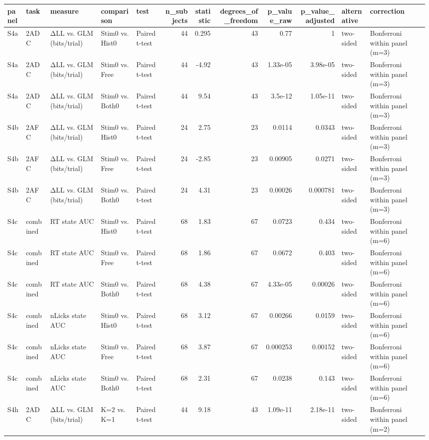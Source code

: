 \begin{tabular}{lllllrrrrrll}
\toprule
panel & task & measure & comparison & test & n\_subjects & statistic & degrees\_of\_freedom & p\_value\_raw & p\_value\_adjusted & alternative & correction \\
\midrule
S4a & 2ADC & ΔLL vs. GLM (bits/trial) & Stim0 vs. Hist0 & Paired t-test & 44 & 0.295 & 43 & 0.77 & 1 & two-sided & Bonferroni within panel (m=3) \\
S4a & 2ADC & ΔLL vs. GLM (bits/trial) & Stim0 vs. Free & Paired t-test & 44 & -4.92 & 43 & 1.33e-05 & 3.98e-05 & two-sided & Bonferroni within panel (m=3) \\
S4a & 2ADC & ΔLL vs. GLM (bits/trial) & Stim0 vs. Both0 & Paired t-test & 44 & 9.54 & 43 & 3.5e-12 & 1.05e-11 & two-sided & Bonferroni within panel (m=3) \\
S4b & 2AFC & ΔLL vs. GLM (bits/trial) & Stim0 vs. Hist0 & Paired t-test & 24 & 2.75 & 23 & 0.0114 & 0.0343 & two-sided & Bonferroni within panel (m=3) \\
S4b & 2AFC & ΔLL vs. GLM (bits/trial) & Stim0 vs. Free & Paired t-test & 24 & -2.85 & 23 & 0.00905 & 0.0271 & two-sided & Bonferroni within panel (m=3) \\
S4b & 2AFC & ΔLL vs. GLM (bits/trial) & Stim0 vs. Both0 & Paired t-test & 24 & 4.31 & 23 & 0.00026 & 0.000781 & two-sided & Bonferroni within panel (m=3) \\
S4c & combined & RT state AUC & Stim0 vs. Hist0 & Paired t-test & 68 & 1.83 & 67 & 0.0723 & 0.434 & two-sided & Bonferroni within panel (m=6) \\
S4c & combined & RT state AUC & Stim0 vs. Free & Paired t-test & 68 & 1.86 & 67 & 0.0672 & 0.403 & two-sided & Bonferroni within panel (m=6) \\
S4c & combined & RT state AUC & Stim0 vs. Both0 & Paired t-test & 68 & 4.38 & 67 & 4.33e-05 & 0.00026 & two-sided & Bonferroni within panel (m=6) \\
S4c & combined & nLicks state AUC & Stim0 vs. Hist0 & Paired t-test & 68 & 3.12 & 67 & 0.00266 & 0.0159 & two-sided & Bonferroni within panel (m=6) \\
S4c & combined & nLicks state AUC & Stim0 vs. Free & Paired t-test & 68 & 3.87 & 67 & 0.000253 & 0.00152 & two-sided & Bonferroni within panel (m=6) \\
S4c & combined & nLicks state AUC & Stim0 vs. Both0 & Paired t-test & 68 & 2.31 & 67 & 0.0238 & 0.143 & two-sided & Bonferroni within panel (m=6) \\
S4h & 2ADC & ΔLL vs. GLM (bits/trial) & K=2 vs. K=1 & Paired t-test & 44 & 9.18 & 43 & 1.09e-11 & 2.18e-11 & two-sided & Bonferroni within panel (m=2) \\

\end{tabular}
